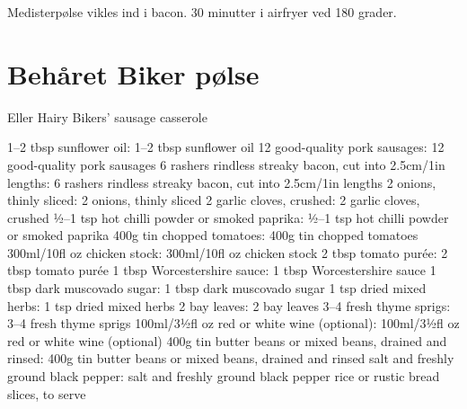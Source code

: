 \documentclass[
  letterpaper,
  DIV=11,
  numbers=noendperiod]{scrreprt}
\begin{document}
Medisterpølse vikles ind i bacon. 30 minutter i airfryer ved 180 grader.

\hypertarget{behuxe5ret-biker-puxf8lse}{%
\section{Behåret Biker pølse}\label{behuxe5ret-biker-puxf8lse}}

Eller Hairy Bikers' sausage casserole

1--2 tbsp sunflower oil: 1--2 tbsp sunflower oil 12 good-quality pork
sausages: 12 good-quality pork sausages 6 rashers rindless streaky
bacon, cut into 2.5cm/1in lengths: 6 rashers rindless streaky bacon, cut
into 2.5cm/1in lengths 2 onions, thinly sliced: 2 onions, thinly sliced
2 garlic cloves, crushed: 2 garlic cloves, crushed ½--1 tsp hot chilli
powder or smoked paprika: ½--1 tsp hot chilli powder or smoked paprika
400g tin chopped tomatoes: 400g tin chopped tomatoes 300ml/10fl oz
chicken stock: 300ml/10fl oz chicken stock 2 tbsp tomato purée: 2 tbsp
tomato purée 1 tbsp Worcestershire sauce: 1 tbsp Worcestershire sauce 1
tbsp dark muscovado sugar: 1 tbsp dark muscovado sugar 1 tsp dried mixed
herbs: 1 tsp dried mixed herbs 2 bay leaves: 2 bay leaves 3--4 fresh
thyme sprigs: 3--4 fresh thyme sprigs 100ml/3½fl oz red or white wine
(optional): 100ml/3½fl oz red or white wine (optional) 400g tin butter
beans or mixed beans, drained and rinsed: 400g tin butter beans or mixed
beans, drained and rinsed salt and freshly ground black pepper: salt and
freshly ground black pepper rice or rustic bread slices, to serve
\end{document}
